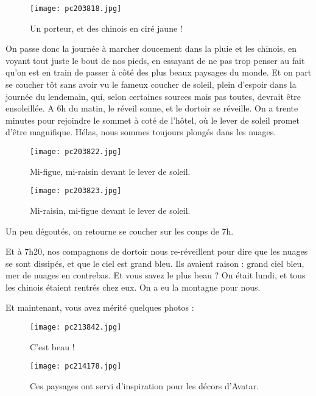 \documentclass{book}
\begin{document}
\begin{figure}[h]
\centering
\texttt{[image: pc203818.jpg]}
\caption*{Un porteur, et des chinois en ciré jaune !}
\end{figure}

On passe donc la journée à marcher doucement dans la pluie et les chinois, en voyant tout juste le bout de nos pieds, en essayant de ne pas trop penser au fait qu'on est en train de passer à côté des plus beaux paysages du monde. Et on part se coucher tôt sans avoir vu le fameux coucher de soleil, plein d'espoir dans la journée du lendemain, qui, selon certaines sources mais pas toutes, devrait être ensoleillée. A 6h du matin, le réveil sonne, et le dortoir se réveille. On a trente minutes pour rejoindre le sommet à coté de l’hôtel, où le lever de soleil promet d'être magnifique. Hélas, nous sommes toujours plongés dans les nuages.


\begin{figure}[h]
\centering
\texttt{[image: pc203822.jpg]}
\caption*{Mi-figue, mi-raisin devant le lever de soleil.}
\end{figure}


\begin{figure}[h]
\centering
\texttt{[image: pc203823.jpg]}
\caption*{Mi-raisin, mi-figue devant le lever de soleil.}
\end{figure}

Un peu dégoutés, on retourne se coucher sur les coups de 7h.

Et à 7h20, nos compagnons de dortoir nous re-réveillent pour dire que les nuages se sont dissipés, et que le ciel est grand bleu. Ils avaient raison : grand ciel bleu, mer de nuages en contrebas. Et vous savez le plus beau ? On était lundi, et tous les chinois étaient rentrés chez eux. On a eu la montagne pour nous.

Et maintenant, vous avez mérité quelques photos :


\begin{figure}[h]
\centering
\texttt{[image: pc213842.jpg]}
\caption*{C'est beau !}
\end{figure}




\begin{figure}[h]
\centering
\texttt{[image: pc214178.jpg]}
\caption*{Ces paysages ont servi d'inspiration pour les décors d'Avatar.}
\end{figure}
\end{document}
